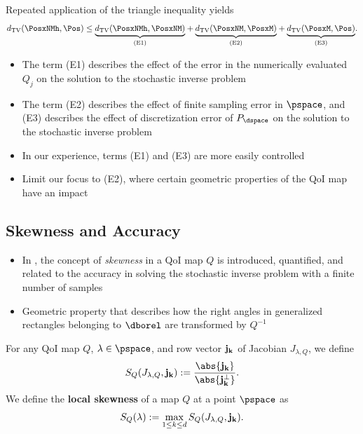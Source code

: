 \begin{frame}[t]

Repeated application of the triangle inequality yields
\begin{equation}
\label{eq:triangleineq}
d_{\text{TV}}(\PosxNMh, \Pos) \leq 
\underset{ \text{(E1)} }{\underbrace{ d_{\text{TV}}(\PosxNMh, \PosxNM)}} + 
\underset{ \text{(E2)} }{\underbrace{ d_{\text{TV}}(\PosxNM, \PosxM) }}+ 
\underset{ \text{(E3)} }{\underbrace{ d_{\text{TV}}(\PosxM, \Pos) }}.
\end{equation}
\begin{itemize}

	\item <1-> The term (E1) describes the effect of the error in the numerically evaluated $Q_j$ on the solution to the stochastic inverse problem
	\item <2-> The term (E2) describes the effect of finite sampling error in $\pspace$, and (E3) describes the effect of discretization error of $P_\dspace$ on the solution to the stochastic inverse problem
	\item <3-> In our experience, terms (E1) and (E3) are more easily controlled
	\item <3-> Limit our focus to (E2), where certain geometric properties of the QoI map have an impact
\end{itemize}
\end{frame}

\subsection{Skewness and Accuracy}
\begin{frame}[t]
\begin{itemize}
	\item In \cite{BGE+15}, the concept of \emph{skewness} in a QoI map $Q$ is introduced, quantified, and related to the accuracy in solving the stochastic inverse problem with a finite number of samples
	\item Geometric property that describes how the right angles in generalized rectangles belonging to $\dborel$ are transformed by $Q^{-1}$
\end{itemize}

\begin{defn}
For any QoI map $Q$, $\lambda \in \pspace$, and row vector $\bf{j}_k$ of Jacobian $J_{\lambda, Q}$, we define
\begin{equation}
S_Q(J_{\lambda,Q}, \bf{j}_k) := \frac{\abs{\bf{j}_k} }{\abs{\bf{j}_k^\perp}}.
\label{eq:skewness}
\end{equation}
We define the \textbf{local skewness} of a map $Q$ at a point $\pspace$ as 
\begin{equation}
S_Q(\lambda) := \max_{1\leq k \leq d} S_Q(J_{\lambda,Q}, \bf{j}_k).
\label{eq:localskewness}
\end{equation}
\end{defn}

\end{frame}

